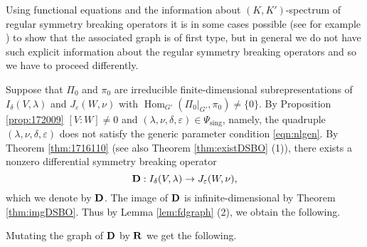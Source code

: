 Using functional equations
 and the information about $(K,K')$-spectrum of regular symmetry breaking operators
 it is in some cases possible (see for example \cite{sbon})
 to show that the associated graph is of first type,
 but in general we do not have such explicit information about the regular symmetry breaking operators and so we have to proceed differently.

\bigskip

Suppose that $\Pi_0$ and $\pi_0$ are
 irreducible finite-dimensional subrepresentations
 of $I_\delta (V,\lambda)$ and $J_\varepsilon (W,\nu)$
 with ${\operatorname{Hom}}_{G'}(\Pi_0|_{G'}, \pi_0) \ne \{0\}$. 
By Proposition \ref{prop:172009}
 $[V:W] \not = 0$
 and
 $(\lambda, \nu, \delta, \varepsilon) \in \Psi_{\operatorname{sing}}$, 
 namely,
 the quadruple $(\lambda, \nu, \delta, \varepsilon)$
 does not satisfy the generic parameter condition  \eqref{eqn:nlgen}.
By Theorem \ref{thm:1716110} (see also Theorem \ref{thm:existDSBO} (1)), 
 there exists a nonzero differential symmetry breaking operator 
\[
   {\bf D}:I_\delta (V,\lambda) \rightarrow J_\varepsilon (W, \nu), 
\]
which we denote by $\bf D$. 
The image of $\bf D$ is infinite-dimensional
 by Theorem \ref{thm:imgDSBO}.  
Thus by Lemma \ref{lem:fdgraph} (2), 
 we obtain the following.  



\medskip
Mutating the graph of $\bf D$ by $\bf R$ we get the following.  

